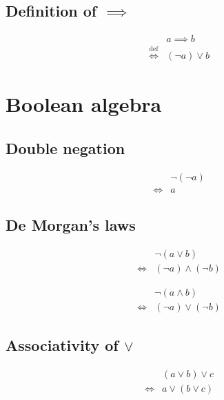 \subsection{Definition of $\implies$}
\begin{defn}
\label{Definition:implies}
\begin{align*}
& a \implies b \\
\overset{\operatorname{def}}{\iff} & (\lnot a) \lor b
\end{align*}
\end{defn}

\section{Boolean algebra}
\subsection{Double negation}
\begin{prop}
\label{Proposition:double_negation}
\begin{align*}
& \lnot (\lnot a) \\
\iff & a
\end{align*}
\end{prop}

\subsection{De Morgan's laws}
\begin{prop}
\label{Proposition:De_Morgan_lor}
\begin{align*}
& \lnot (a \lor b) \\
\iff & (\lnot a) \land (\lnot b)
\end{align*}
\end{prop}

\begin{prop}
\label{Proposition:De_Morgan_land}
\begin{align*}
& \lnot (a \land b) \\
\iff & (\lnot a) \lor (\lnot b)
\end{align*}
\end{prop}

\subsection{Associativity of $\lor$}
\begin{prop}
\label{Proposition:lor_associativity}
\begin{align*}
& (a \lor b) \lor c \\
\iff & a \lor (b \lor c)
\end{align*}
\end{prop}

